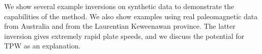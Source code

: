 We show several example inversions on synthetic data to demonstrate the capabilities of the method.
We also show examples using real paleomagnetic data from Australia and 
from the Laurentian Keweenawan province. The latter inversion gives 
extremely rapid plate speeds, and we discuss the potential for TPW as an explanation.

\nocite{newton1728principia}
